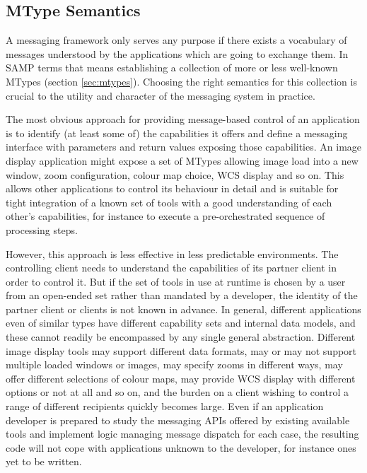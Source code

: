 \documentclass[5p]{elsarticle}
\begin{document}
\subsection{MType Semantics} \label{sec:messageSemantics}

A messaging framework only serves any purpose if there exists
a vocabulary of messages understood by the
applications which are going to exchange them.
In SAMP terms that means establishing a collection of
more or less well-known MTypes (section \ref{sec:mtypes}).
Choosing the right semantics for this collection is crucial
to the utility and character of the messaging system in practice.

The most obvious approach for providing message-based control
of an application
is to identify (at least some of) the capabilities it offers and
define a messaging interface with parameters and return values
exposing those capabilities.  An image display application might
expose a set of MTypes allowing image load into a new window,
zoom configuration, colour map choice, WCS display and so on.
This allows other applications to control its behaviour
in detail and is suitable for tight integration of a known set
of tools with a good understanding of each other's capabilities,
for instance to execute a pre-orchestrated sequence of processing steps.

However, this approach is less effective in less predictable environments.
The controlling client needs to understand
the capabilities of its partner client in order to control it.
But if the set of tools in use at runtime is chosen by a
user from an open-ended set
rather than mandated by a developer, the identity of the
partner client or clients is not known in advance.
In general, different applications even of similar types
have different capability sets
and internal data models, and these cannot readily be encompassed
by any single general abstraction.
Different image display tools
may support different data formats,
may or may not support multiple loaded windows or images,
may specify zooms in different ways,
may offer different selections of colour maps,
may provide WCS display with different options or not at all
and so on,
and the burden on a client wishing to control a range
of different recipients quickly becomes large.
Even if an application developer is prepared to study the
messaging APIs offered by existing available tools and implement logic
managing message dispatch for each case,
the resulting code will not cope with applications
unknown to the developer,
for instance ones yet to be written.
\end{document}
